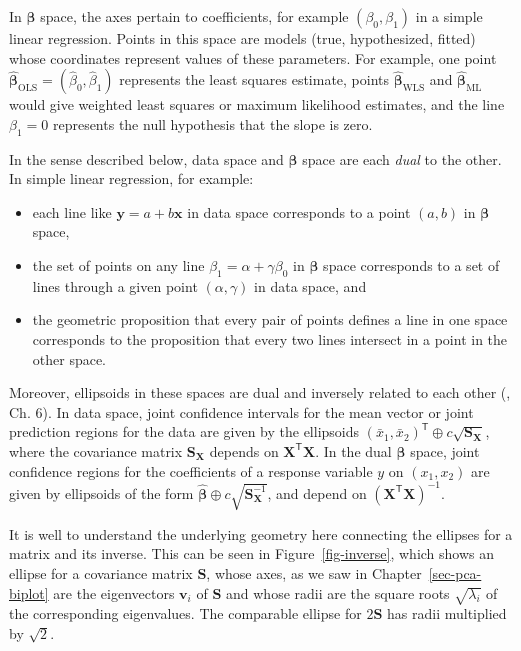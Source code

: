\documentclass[
  letterpaper,
  10pt,
  krantz2]{krantz}
\providecommand{\tightlist}{%
  \setlength{\itemsep}{0pt}\setlength{\parskip}{0pt}}\usepackage{longtable,booktabs,array}
\begin{document}
{In \(\mathbf{\beta}\) space, the axes pertain to coefficients, for
example \((\beta_0, \beta_1)\) in a simple linear regression. Points in
this space are models (true, hypothesized, fitted) whose coordinates
represent values of these parameters. For example, one point
\(\widehat{\mathbf{\beta}}_{\text{OLS}} = (\hat{\beta}_0, \hat{\beta}_1)\)
represents the least squares estimate, points
\(\widehat{\mathbf{\beta}}_{\text{WLS}}\) and
\(\widehat{\mathbf{\beta}}_{\text{ML}}\) would give weighted least
squares or maximum likelihood estimates, and the line \(\beta_1 = 0\)
represents the null hypothesis that the slope is zero.

In the sense described below, data space and \(\boldsymbol{\beta}\)
space are each \emph{dual} to the other. In simple linear regression,
for example:

\begin{itemize}
\tightlist
\item
  each line like \(\mathbf{y} = a + b \mathbf{x}\) in data space
  corresponds to a point \((a,b)\) in \(\mathbf{\beta}\) space,
\item
  the set of points on any line \(\beta_1 = \alpha + \gamma \beta_0\) in
  \(\mathbf{\beta}\) space corresponds to a set of lines through a given
  point \((\alpha, \gamma)\) in data space, and
\item
  the geometric proposition that every pair of points defines a line in
  one space corresponds to the proposition that every two lines
  intersect in a point in the other space.
\end{itemize}

Moreover, ellipsoids in these spaces are dual and inversely related to
each other (, Ch. 6). In data
space, joint confidence intervals for the mean vector or joint
prediction regions for the data are given by the ellipsoids
\((\bar{x}_1, \bar{x}_2)^\textsf{T} \oplus c \sqrt{\mathbf{S}_{\mathbf{X}}}\),
where the covariance matrix \(\mathbf{S}_{\mathbf{X}}\) depends on
\(\mathbf{X}^\mathsf{T}\mathbf{X}\). In the dual \(\mathbf{\beta}\)
space, joint confidence regions for the coefficients of a response
variable \(y\) on \((x_1, x_2)\) are given by ellipsoids of the form
\(\widehat{\mathbf{\beta}} \oplus c \sqrt{\mathbf{S}_{\mathbf{X}}^{-1}}\),
and depend on \(\mathbf{(\mathbf{X}^\mathsf{T}\mathbf{X})}^{-1}\).

It is well to understand the underlying geometry here connecting the
ellipses for a matrix and its inverse. This can be seen in
Figure~\ref{fig-inverse}, which shows an ellipse for a covariance matrix
\(\mathbf{S}\), whose axes, as we saw in Chapter~\ref{sec-pca-biplot}
are the eigenvectors \(\mathbf{v}_i\) of \(\mathbf{S}\) and whose radii
are the square roots \(\sqrt{\lambda_i}\) of the corresponding
eigenvalues. The comparable ellipse for \(2 \mathbf{S}\) has radii
multiplied by \(\sqrt{2}\).

}
\end{document}

